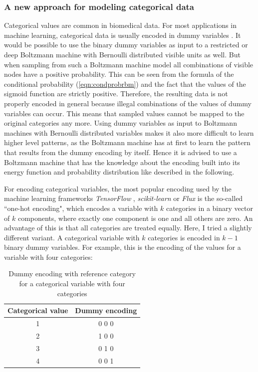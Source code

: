 \documentclass[12pt]{article}
\newcommand{\apkg}[1]{\emph{#1}}
\begin{document}
\subsubsection{A new approach for modeling categorical data}\label{methodsoftmax0}
Categorical values are common in biomedical data.
For most applications in machine learning, categorical data is usually encoded in dummy variables \citep{hastie_elements}.
It would be possible to use the binary dummy variables as input to a restricted or deep Boltzmann machine with Bernoulli distributed visible units as well.
But when sampling from such a Boltzmann machine model all combinations of visible nodes have a positive probability. This can be seen from the formula of the conditional probability (\ref{eqn:condprobrbm}) and the fact that the values of the sigmoid function are strictly positive.
Therefore, the resulting data is not properly encoded in general  because illegal combinations of the values of dummy variables can occur.
This means that sampled values cannot be mapped to the original categories any more.
Using dummy variables as input to Boltzmann machines with Bernoulli distributed variables makes it also more difficult to learn higher level patterns, as the Boltzmann machine has at first to learn the pattern that results from the dummy encoding  by itself. Hence it is advised to use a Boltzmann machine that has the knowledge about the encoding built into its energy function and probability distribution like described in the following.


For encoding categorical variables, the most popular encoding used by the machine learning frameworks \apkg{TensorFlow} \citep{tensorflow}, \apkg{scikit-learn} \citep{scikit-learn} or \apkg{Flux} \citep{flux} is the so-called ``one-hot encoding", which encodes a variable with $k$ categories in a binary vector of $k$ components, where exactly one component is one and all others are zero.
An advantage of this is that all categories are treated equally.
Here, I tried a slightly different variant.
A categorical variable with $k$ categories is encoded in $k-1$ binary dummy variables.
For example, this is the encoding of the values for a variable with four categories:

\begin{table}[h!]
\centering
\begin{tabular}{cc}
Categorical value & Dummy encoding \\
\hline
1 & 0 0 0 \\
2 & 1 0 0 \\
3 & 0 1 0 \\
4 & 0 0 1 \\
\end{tabular}
\caption{Dummy encoding with reference category for a categorical variable with four categories}\label{dummenc}
\end{table}
\end{document}
